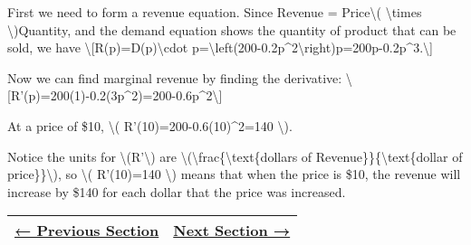 First we need to form a revenue equation. Since Revenue =
Price\textbackslash{}( \textbackslash{}times \textbackslash{})Quantity,
and the demand equation shows the quantity of product that can be sold,
we have \textbackslash{}{[}R(p)=D(p)\textbackslash{}cdot
p=\textbackslash{}left(200-0.2p\^{}2\textbackslash{}right)p=200p-0.2p\^{}3.\textbackslash{}{]}

Now we can find marginal revenue by finding the derivative:
\textbackslash{}{[}R'(p)=200(1)-0.2(3p\^{}2)=200-0.6p\^{}2\textbackslash{}{]}

At a price of \$10, \textbackslash{}( R'(10)=200-0.6(10)\^{}2=140
\textbackslash{}).

Notice the units for \textbackslash{}(R'\textbackslash{}) are
\textbackslash{}(\textbackslash{}frac\{\textbackslash{}text\{dollars of
Revenue\}\}\{\textbackslash{}text\{dollar of price\}\}\textbackslash{}),
so \textbackslash{}( R'(10)=140 \textbackslash{}) means that when the
price is \$10, the revenue will increase by \$140 for each dollar that
the price was increased.

\begin{longtable}[]{@{}ll@{}}
\toprule
\endhead
\href{section2-2.php}{← Previous Section} & \href{section2-4.php}{Next
Section →}\tabularnewline
\bottomrule
\end{longtable}
